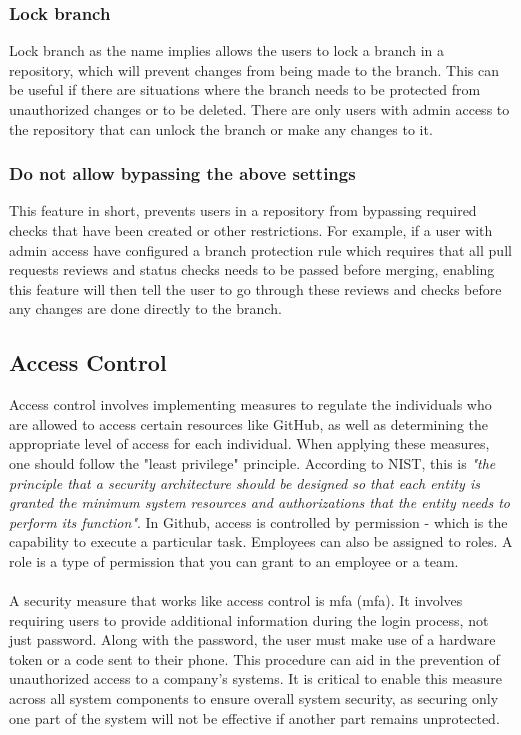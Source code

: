 \subsubsection{Lock branch}
Lock branch as the name implies allows the users to lock a branch in a repository, which will prevent changes from being made to the branch. This can be useful if there are situations where the branch needs to be protected from unauthorized changes or to be deleted. There are only users with admin access to the repository that can unlock the branch or make any changes to it. 

\subsubsection{Do not allow bypassing the above settings}
This feature in short, prevents users in a repository from bypassing required checks that have been created or other restrictions. For example, if a user with admin access have configured a branch protection rule which requires that all pull requests reviews and status checks needs to be passed before merging, enabling this feature will then tell the user to go through these reviews and checks before any changes are done directly to the branch. 
\newpage

\subsection{Access Control}
Access control involves implementing measures to regulate the individuals who are allowed to access certain resources like GitHub, as well as determining the appropriate level of access for each individual. When applying these measures, one should follow the "least privilege" principle. According to NIST, this is \textit{"the principle that a security architecture should be designed so that each entity is granted the minimum system resources and authorizations that the entity needs to perform its function"}\cite{leastprivilege}. In Github, access is controlled by permission - which is the capability to execute a particular task. Employees can also be assigned to roles. A role is a type of permission that you can grant to an employee or a team. \cite{accesscontroll}
\\
\\
A security measure that works like access control is \acrlong{mfa} (\acrshort{mfa}). It involves requiring users to provide additional information during the login process, not just password. Along with the password, the user must make use of a hardware token or a code sent to their phone. 
This procedure can aid in the prevention of unauthorized access to a company's systems. It is critical to enable this measure across all system components to ensure overall system security, as securing only one part of the system will not be effective if another part remains unprotected. 

